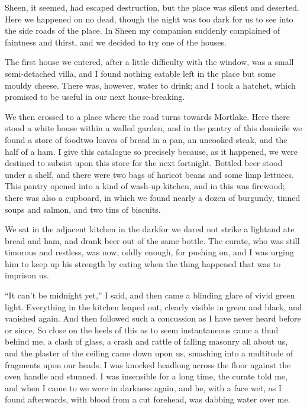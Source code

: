 Sheen, it seemed, had escaped destruction, but the place was silent
and deserted. Here we happened on no dead, though the night was too
dark for us to see into the side roads of the place. In Sheen my
companion suddenly complained of faintness and thirst, and we
decided to try one of the houses.

The first house we entered, after a little difficulty with the
window, was a small semi-detached villa, and I found nothing
eatable left in the place but some mouldy cheese. There was,
however, water to drink; and I took a hatchet, which promised to be
useful in our next house-breaking.

We then crossed to a place where the road turns towards Mortlake.
Here there stood a white house within a walled garden, and in the
pantry of this domicile we found a store of food\dash{}two loaves of
bread in a pan, an uncooked steak, and the half of a ham. I give
this catalogue so precisely because, as it happened, we were
destined to subsist upon this store for the next fortnight. Bottled
beer stood under a shelf, and there were two bags of haricot beans
and some limp lettuces. This pantry opened into a kind of wash-up
kitchen, and in this was firewood; there was also a cupboard, in
which we found nearly a dozen of burgundy, tinned soups and salmon,
and two tins of biscuits.

We sat in the adjacent kitchen in the dark\dash{}for we dared not strike
a light\dash{}and ate bread and ham, and drank beer out of the same
bottle. The curate, who was still timorous and restless, was now,
oddly enough, for pushing on, and I was urging him to keep up his
strength by eating when the thing happened that was to imprison
us.

``It can't be midnight yet,'' I said, and then came a blinding glare
of vivid green light. Everything in the kitchen leaped out, clearly
visible in green and black, and vanished again. And then followed
such a concussion as I have never heard before or since. So close
on the heels of this as to seem instantaneous came a thud behind
me, a clash of glass, a crash and rattle of falling masonry all
about us, and the plaster of the ceiling came down upon us,
smashing into a multitude of fragments upon our heads. I was
knocked headlong across the floor against the oven handle and
stunned. I was insensible for a long time, the curate told me, and
when I came to we were in darkness again, and he, with a face wet,
as I found afterwards, with blood from a cut forehead, was dabbing
water over me.

